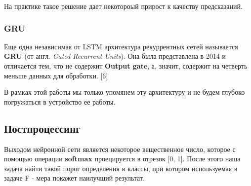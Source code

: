 На практике такое решение дает некотороый прирост к качеству предсказаний.

\subsubsection{GRU}
Еще одна независимая от LSTM архитектура рекуррентных сетей называется \textbf{GRU} (от англ. \textit{Gated Recurrent Units}). Она была представлена в 2014 и отличается тем, что не содержит \textbf{Output gate}, а, значит, содержит на четверть меньше данных для обработки. [6]

В рамках этой работы мы только упомянем эту архитектуру и не будем глубоко погружаться в устройство ее работы.


\subsection{Постпроцессинг}

Выходом нейронной сети является некоторое вещественное число, которое с помощью операции \textbf{softmax} проецируется в отрезок [0, 1]. После этого наша задача найти такой порог определения в классы, при котором используемая в задаче F - мера покажет наилучший результат.


\pagebreak
